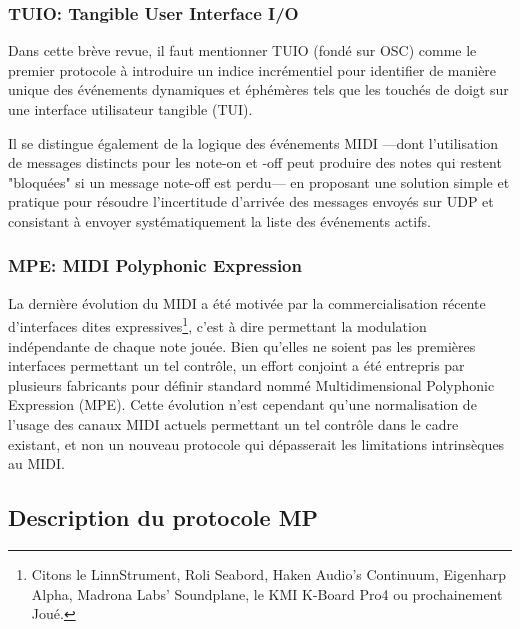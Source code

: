 \subsubsection{TUIO: Tangible User Interface I/O}
Dans cette brève revue, il faut mentionner TUIO \cite{kaltenbrunner_tuio:_2005} (fondé sur OSC) comme le premier protocole à introduire un indice incrémentiel pour identifier de manière unique des événements dynamiques et éphémères tels que les touchés de doigt sur une interface utilisateur tangible (TUI).

Il se distingue également de la logique des événements MIDI —dont l'utilisation de messages distincts pour les note-on et -off peut produire des notes qui restent "bloquées" si un message note-off est perdu— en proposant une solution simple et pratique pour résoudre l'incertitude d'arrivée des messages envoyés sur UDP et consistant à envoyer systématiquement la liste des événements actifs.

\subsubsection{\gls{MPE}: MIDI Polyphonic Expression}
La dernière évolution du MIDI a été motivée par la commercialisation récente d'interfaces dites expressives\footnote{ Citons le LinnStrument, Roli Seabord, Haken Audio’s Continuum, Eigenharp Alpha, Madrona Labs’ Soundplane, le KMI K-Board Pro4 ou prochainement Joué.}, c'est à dire permettant la modulation indépendante de chaque note jouée. Bien qu'elles ne soient pas les premières interfaces permettant un tel contrôle, un effort conjoint a été entrepris par plusieurs fabricants pour définir standard nommé Multidimensional Polyphonic Expression (\gls{MPE}). Cette évolution n'est cependant qu'une normalisation de l'usage des canaux MIDI actuels permettant un tel contrôle dans le cadre existant, et non un nouveau protocole qui dépasserait les limitations intrinsèques au MIDI.

\subsection{Description du protocole MP}


